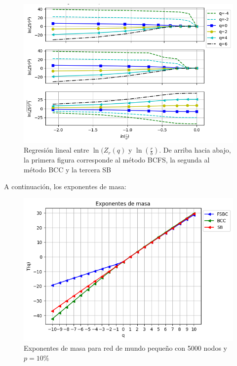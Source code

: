 \begin{figure}[H]
    \centering
    \includegraphics[scale=0.7]{Capitulo4Multifractalidad/imagenes/a_TqLnrBCsmallWorld4000p10.png}
    \caption{Regresión lineal entre $\ln(Z_r(q)$ y $\ln(\frac{r}{b})$. De arriba hacia abajo, la primera figura corresponde al método BCFS, la segunda al método BCC y la tercera SB}
\end{figure}

A continuación, los exponentes de masa:

\begin{figure}[H]
    \centering
    \includegraphics[scale=0.7]{Capitulo4Multifractalidad/imagenes/a_TqsmallWorld4000p10.png}
    \caption{Exponentes de masa para red de mundo pequeño con 5000 nodos y $p=10\%$}
\end{figure}

